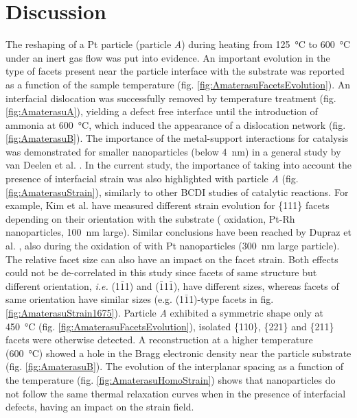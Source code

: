 \section{Discussion}

The reshaping of a Pt particle (particle \textit{A}) during heating from \qty{125}{\degreeCelsius} to \qty{600}{\degreeCelsius} under an inert gas flow was put into evidence.
An important evolution in the type of facets present near the particle interface with the substrate was reported as a function of the sample temperature (fig. \ref{fig:AmaterasuFacetsEvolution}).
An interfacial dislocation was successfully removed by temperature treatment (fig. \ref{fig:AmaterasuA}), yielding a defect free interface until the introduction of ammonia at \qty{600}{\degreeCelsius}, which induced the appearance of a dislocation network (fig. \ref{fig:AmaterasuB}).
The importance of the metal-support interactions for catalysis was demonstrated for smaller nanoparticles (below \qty{4}{\nm}) in a general study by van Deelen et al. \parencite*{vanDeelen2019}.
In the current study, the importance of taking into account the presence of interfacial strain was also highlighted with particle \textit{A} (fig. \ref{fig:AmaterasuStrain}), similarly to other BCDI studies of catalytic reactions.
For example, Kim et al. \parencite*{Kim2021} have measured different strain evolution for \{111\} facets depending on their orientation with the  substrate ( oxidation, Pt-Rh nanoparticles, \qty{100}{\nm} large).
Similar conclusions have been reached by Dupraz et al. \parencite*{Dupraz2022}, also during the oxidation of  with Pt nanoparticles (\qty{300}{\nm} large particle).
The relative facet size can also have an impact on the facet strain.
Both effects could not be de-correlated in this study since facets of same structure but different orientation, \textit{i.e.} (1$\bar{1}$1) and ($\bar{1}$1$\bar{1}$), have different sizes, whereas facets of same orientation have similar sizes (e.g. (1$\bar{1}$1)-type facets in fig. \ref{fig:AmaterasuStrain1675}).
Particle \textit{A} exhibited a symmetric shape only at \qty{450}{\degreeCelsius} (fig. \ref{fig:AmaterasuFacetsEvolution}), isolated \{110\}, \{221\} and \{211\} facets were otherwise detected.
A reconstruction at a higher temperature (\qty{600}{\degreeCelsius}) showed a hole in the Bragg electronic density near the particle substrate (fig. \ref{fig:AmaterasuB}).
The evolution of the interplanar spacing as a function of the temperature (fig. \ref{fig:AmaterasuHomoStrain}) shows that nanoparticles do not follow the same thermal relaxation curves when in the presence of interfacial defects, having an impact on the strain field.

